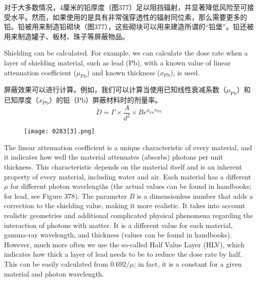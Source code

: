 \documentclass[dvipsnames, svgnames,a4paper,11pt]{article}
\begin{document}
对于大多数情况，4厘米的铅厚度（图377）足以阻挡辐射，并显著降低风险至可接受水平。然而，如果使用的是具有非常强穿透性的辐射同位素，那么需要更多的铅。铅被用来制造铅砌块（图377），这些砌块可以用来建造所谓的“铅堡”。铅还被用来制造罐子、板材、珠子等屏蔽物品。


Shielding can be calculated. For example, we can calculate the dose rate when a layer of shielding material, such as lead (\(\mathrm{Pb}\)), with a known value of linear attenuation coefficient (\(\mu_{\mathrm{Pb}}\)) and known thickness (\(x_{\mathrm{Pb}}\)), is used.

屏蔽效果可以进行计算。例如，我们可以计算当使用已知线性衰减系数（\(\mu_{\mathrm{Pb}}\)）和已知厚度（\(x_{\mathrm{Pb}}\)）的铅（\(\mathrm{Pb}\)）屏蔽材料时的剂量率。
\[
\dot{D} = \Gamma \times \frac{A}{d^{2}}\times Be^{\mu_\mathrm{Pb}x_\mathrm{Pb}}
\]

\begin{figure}[h]
    \centering
    \texttt{[image: 0283[3].png]} 
     \label{fig378}
\end{figure}

The linear attenuation coefficient is a unique characteristic of every material, and it indicates how well the material attenuates (absorbs) photons per unit thickness. This characteristic depends on the material itself and is an inherent property of every material, including water and air. Each material has a different \(\mu\) for different photon wavelengths (the actual values can be found in handbooks; for lead, see Figure 378). The parameter \(B\) is a dimensionless number that adds a correction to the shielding value, making it more realistic. It takes into account realistic geometries and additional complicated physical phenomena regarding the interaction of photons with matter. It is a different value for each material, gamma-ray wavelength, and thickness (values can be found in handbooks). However, much more often we use the so-called Half Value Layer (HLV), which indicates how thick a layer of lead needs to be to reduce the dose rate by half. This can be easily calculated from \(0.692/\mu\); in fact, it is a constant for a given material and photon wavelength.
\end{document}
